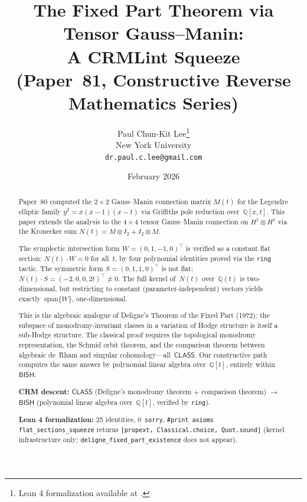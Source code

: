 \documentclass[11pt]{article}
\title{The Fixed Part Theorem via Tensor Gauss--Manin:\\
  A CRMLint Squeeze\\[6pt]
  {\large (Paper~81, Constructive Reverse Mathematics Series)}}
\author{Paul Chun-Kit Lee\thanks{Lean 4 formalization available at \leanRepo.} \\
New York University \\
\texttt{dr.paul.c.lee@gmail.com}}
\date{February 2026}
\theoremstyle{plain}
\theoremstyle{definition}
\theoremstyle{remark}
\newcommand{\Q}{\mathbb{Q}}
\newcommand{\BISH}{\mathsf{BISH}}
\newcommand{\CLASS}{\mathsf{CLASS}}
\begin{document}
\maketitle

\begin{abstract}
Paper~80 computed the $2 \times 2$ Gauss--Manin connection matrix
$M(t)$ for the Legendre elliptic family $y^2 = x(x-1)(x-t)$ via
Griffiths pole reduction over~$\Q[x,t]$.
This paper extends the analysis to the $4 \times 4$ tensor
Gauss--Manin connection on $H^1 \otimes H^1$ via the Kronecker
sum $N(t) = M \otimes I_2 + I_2 \otimes M$.

The symplectic intersection form $W = (0,1,-1,0)^{\!\top}$ is
verified as a constant flat section: $N(t) \cdot W = 0$ for all~$t$,
by four polynomial identities proved via the \texttt{ring} tactic.
The symmetric form $S = (0,1,1,0)^{\!\top}$ is not flat:
$N(t) \cdot S = (-2, 0, 0, 2t)^{\!\top} \neq 0$.
The full kernel of~$N(t)$ over~$\Q(t)$ is two-dimensional,
but restricting to constant (parameter-independent) vectors
yields exactly~$\mathrm{span}\{W\}$, one-dimensional.

This is the algebraic analogue of Deligne's Theorem of the
Fixed Part (1972): the subspace of monodromy-invariant
classes in a variation of Hodge structure is itself a
sub-Hodge structure.  The classical proof requires the
topological monodromy representation, the Schmid orbit
theorem, and the comparison theorem between algebraic de~Rham
and singular cohomology---all~$\CLASS$.  Our constructive
path computes the same answer by polynomial linear algebra
over~$\Q[t]$, entirely within~$\BISH$.

\medskip\noindent
\textbf{CRM descent:}
$\CLASS$ (Deligne's monodromy theorem $+$ comparison theorem)
$\longrightarrow$ $\BISH$ (polynomial linear algebra over~$\Q[t]$,
verified by \texttt{ring}).

\medskip\noindent
\textbf{Lean 4 formalization:} 25 identities, 0~\texttt{sorry},
\texttt{\#print axioms flat\_sections\_squeeze} returns
\texttt{[propext, Classical.choice, Quot.sound]}
(kernel infrastructure only;
\texttt{deligne\_fixed\_part\_existence} does not appear).
\end{abstract}

\tableofcontents
\newpage

\end{document}
